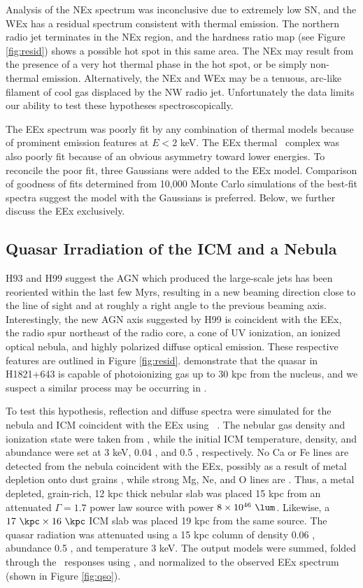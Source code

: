 \documentclass[useAMS,usenatbib]{mn2e}
\begin{document}
Analysis of the NEx spectrum was inconclusive due to extremely low SN,
and the WEx has a residual spectrum consistent with thermal
emission. The northern radio jet terminates in the NEx region, and the
hardness ratio map (see Figure \ref{fig:resid}) shows a possible hot
spot in this same area. The NEx may result from the presence of a very
hot thermal phase in the hot spot, or be simply non-thermal
emission. Alternatively, the NEx and WEx may be a tenuous, arc-like
filament of cool gas displaced by the NW radio jet. Unfortunately the
data limits our ability to test these hypotheses spectroscopically.

The EEx spectrum was poorly fit by any combination of thermal models
because of prominent emission features at $E < 2$ keV. The EEx thermal
\feka\ complex was also poorly fit because of an obvious asymmetry
toward lower energies. To reconcile the poor fit, three Gaussians were
added to the EEx model. Comparison of goodness of fits determined from
10,000 Monte Carlo simulations of the best-fit spectra suggest the
model with the Gaussians is preferred. Below, we further discuss the
EEx exclusively.

\subsection{Quasar Irradiation of the ICM and a Nebula}

H93 and H99 suggest the AGN which produced the large-scale jets has
been reoriented within the last few Myrs, resulting in a new beaming
direction close to the line of sight and at roughly a right angle to
the previous beaming axis. Interestingly, the new AGN axis suggested
by H99 is coincident with the EEx, the radio spur northeast of the
radio core, a cone of UV ionization, an ionized optical nebula, and
highly polarized diffuse optical emission. These respective features
are outlined in Figure \ref{fig:resid}. \citet{2010MNRAS.402.1561R}
demonstrate that the quasar in H1821+643 is capable of photoionizing
gas up to 30 kpc from the nucleus, and we suspect a similar process
may be occurring in \irs.

To test this hypothesis, reflection and diffuse spectra were simulated
for the nebula and ICM coincident with the EEx using
\cloudy\ \citep{cloudy}. The nebular gas density and ionization state
were taken from \citet{2000AJ....120..562T}, while the initial ICM
temperature, density, and abundance were set at 3 keV, 0.04 \pcc, and
0.5 \Zsol, respectively. No Ca or Fe lines are detected from the
nebula coincident with the EEx, possibly as a result of metal
depletion onto dust grains \citep[\eg][]{1993ApJ...414L..17D}, while
strong Mg, Ne, and O lines are \citep{2000AJ....120..562T}. Thus, a
metal depleted, grain-rich, 12 kpc thick nebular slab was placed 15
kpc from an attenuated $\Gamma = 1.7$ power law source with power $8
\times 10^{46} ~\lum$. Likewise, a $17 ~\kpc \times 16 ~\kpc$ ICM slab
was placed 19 kpc from the same source. The quasar radiation was
attenuated using a 15 kpc column of density 0.06 \pcc, abundance 0.5
\Zsol, and temperature 3 keV. The output models were summed, folded
through the \cxo\ responses using \xspec, and normalized to the
observed EEx spectrum (shown in Figure \ref{fig:qso}).
\end{document}
